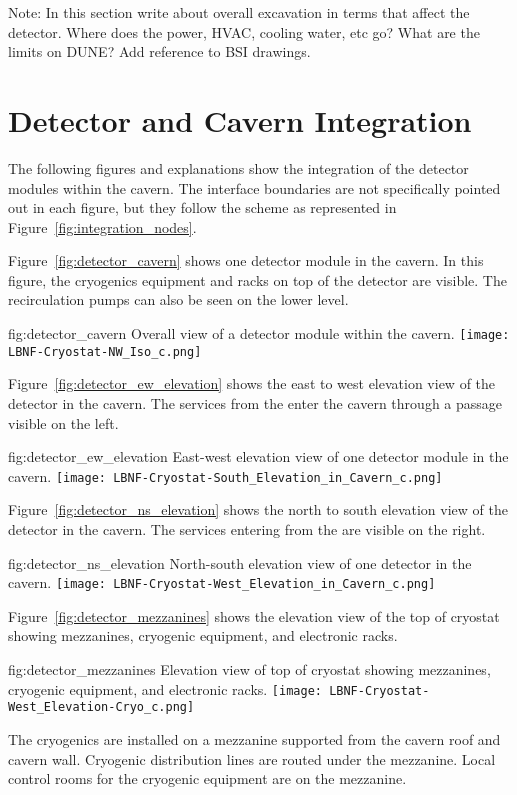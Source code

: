 Note: In this section write about overall excavation in terms that affect the detector. Where
does the power, HVAC, cooling water, etc go? What are the limits on DUNE? Add reference to BSI drawings.


\section{Detector and Cavern Integration}
\label{sec:fdsp-coord-det-cav-integ}
The following figures and explanations show the
integration of the detector modules within the cavern. The interface
boundaries are not specifically pointed out in each figure, but they
follow the scheme as represented in Figure~\ref{fig:integration_nodes}.

Figure~\ref{fig:detector_cavern} shows one detector module in the
cavern. In this figure, the cryogenics equipment and racks on top of
the detector are visible. The  recirculation pumps can also be seen
on the lower level.
\begin{dunefigure}{fig:detector_cavern}
  {Overall view of a detector module within the cavern.}
  \texttt{[image: LBNF-Cryostat-NW\_Iso\_c.png]}
\end{dunefigure}

Figure~\ref{fig:detector_ew_elevation} shows the east to west
elevation view of the detector in the cavern. The services from the
 enter the cavern through a passage visible on the left.
\begin{dunefigure}{fig:detector_ew_elevation}
  {East-west elevation view of one detector module in the cavern.}
  \texttt{[image: LBNF-Cryostat-South\_Elevation\_in\_Cavern\_c.png]}
\end{dunefigure}

Figure~\ref{fig:detector_ns_elevation} shows the north to south
elevation view of the detector in the cavern. The services entering
from the  are visible on the right.
\begin{dunefigure}{fig:detector_ns_elevation}
  {North-south elevation view of one detector in the cavern.}
  \texttt{[image: LBNF-Cryostat-West\_Elevation\_in\_Cavern\_c.png]}
\end{dunefigure}

Figure~\ref{fig:detector_mezzanines} shows the elevation view of the
top of cryostat showing mezzanines, cryogenic equipment, and
electronic racks.
\begin{dunefigure}{fig:detector_mezzanines}
  {Elevation view of top of cryostat showing mezzanines, cryogenic
    equipment, and electronic racks.}
  \texttt{[image: LBNF-Cryostat-West\_Elevation-Cryo\_c.png]}
\end{dunefigure}
The cryogenics are installed on a mezzanine supported from
the cavern roof and cavern wall. Cryogenic distribution lines are
routed under the mezzanine. Local control rooms for the
cryogenic equipment are on the mezzanine.

